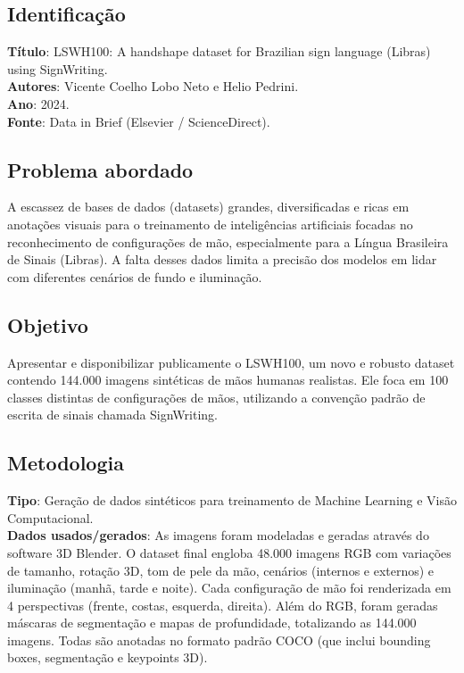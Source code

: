 \documentclass[12pt, a4paper]{article}
\begin{document}
\subsection{Identificação}
\textbf{Título}: LSWH100: A handshape dataset for Brazilian sign language (Libras) using SignWriting.\\
\textbf{Autores}: Vicente Coelho Lobo Neto e Helio Pedrini.\\
\textbf{Ano}: 2024.\\
\textbf{Fonte}: Data in Brief (Elsevier / ScienceDirect).\\
\subsection{Problema abordado}
A escassez de bases de dados (datasets) grandes, diversificadas e ricas em anotações visuais para o treinamento de inteligências artificiais focadas no reconhecimento de configurações de mão, especialmente para a Língua Brasileira de Sinais (Libras). A falta desses dados limita a precisão dos modelos em lidar com diferentes cenários de fundo e iluminação.\\
\subsection{Objetivo}
Apresentar e disponibilizar publicamente o LSWH100, um novo e robusto dataset contendo 144.000 imagens sintéticas de mãos humanas realistas. Ele foca em 100 classes distintas de configurações de mãos, utilizando a convenção padrão de escrita de sinais chamada SignWriting.\\
\subsection{Metodologia}
\textbf{Tipo}: Geração de dados sintéticos para treinamento de Machine Learning e Visão Computacional.\\
\textbf{Dados usados/gerados}: As imagens foram modeladas e geradas através do software 3D Blender. O dataset final engloba 48.000 imagens RGB com variações de tamanho, rotação 3D, tom de pele da mão, cenários (internos e externos) e iluminação (manhã, tarde e noite). Cada configuração de mão foi renderizada em 4 perspectivas (frente, costas, esquerda, direita). Além do RGB, foram geradas máscaras de segmentação e mapas de profundidade, totalizando as 144.000 imagens. Todas são anotadas no formato padrão COCO (que inclui bounding boxes, segmentação e keypoints 3D).\\
\end{document}
